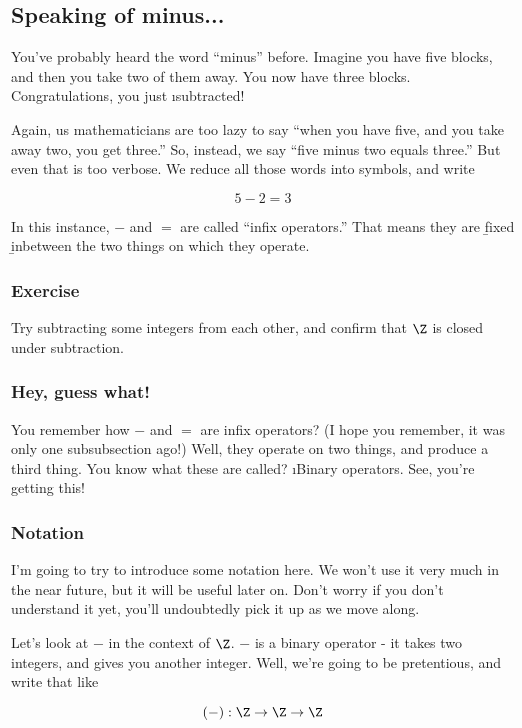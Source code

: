 \subsection{Speaking of minus...}

You've probably heard the word ``minus'' before. Imagine you have five blocks,
and then you take two of them away. You now have three blocks. Congratulations,
you just \i{subtracted}! 

Again, us mathematicians are too lazy to say ``when you have five, and you take
away two, you get three.'' So, instead, we say ``five minus two equals three.''
But even that is too verbose. We reduce all those words into symbols, and write

\[ 5 - 2 = 3 \]

In this instance, $-$ and $=$ are called ``infix operators.'' That means they
are \b{fix}ed \b{in}between the two things on which they operate.

\subsubsection{Exercise}

Try subtracting some integers from each other, and confirm that $\Z$ is closed
under subtraction.

\subsubsection{Hey, guess what!}

You remember how $-$ and $=$ are infix operators? (I hope you remember, it was
only one subsubsection ago!) Well, they operate on two things, and produce a third
thing. You know what these are called? \i{Binary operators}. See, you're getting
this!

\subsubsection{Notation}

I'm going to try to introduce some notation here. We won't use it very much in
the near future, but it will be useful later on. Don't worry if you don't
understand it yet, you'll undoubtedly pick it up as we move along.

Let's look at $-$ in the context of $\Z$. $-$ is a binary operator - it takes two
integers, and gives you another integer. Well, we're going to be pretentious,
and write that like 

\[ (-) : \Z \to \Z \to \Z \]

